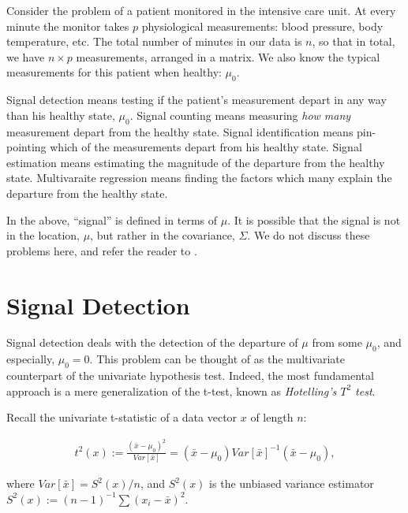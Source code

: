 \documentclass[]{book}
\theoremstyle{definition}
\theoremstyle{definition}
\theoremstyle{remark}
\let\BeginKnitrBlock\begin \let\EndKnitrBlock\end
\begin{document}
\BeginKnitrBlock{example}
\protect\hypertarget{ex:icu}{}{\label{ex:icu}}Consider the problem of a
patient monitored in the intensive care unit. At every minute the
monitor takes \(p\) physiological measurements: blood pressure, body
temperature, etc. The total number of minutes in our data is \(n\), so
that in total, we have \(n \times p\) measurements, arranged in a
matrix. We also know the typical measurements for this patient when
healthy: \(\mu_0\).

Signal detection means testing if the patient's measurement depart in
any way than his healthy state, \(\mu_0\). Signal counting means
measuring \emph{how many} measurement depart from the healthy state.
Signal identification means pin-pointing which of the measurements
depart from his healthy state. Signal estimation means estimating the
magnitude of the departure from the healthy state. Multivaraite
regression means finding the factors which many explain the departure
from the healthy state.
\EndKnitrBlock{example}

\BeginKnitrBlock{remark}
In the above, ``signal'' is defined in terms of
\(\mu\). It is possible that the signal is not in the location, \(\mu\),
but rather in the covariance, \(\Sigma\). We do not discuss these
problems here, and refer the reader to \citet{nadler2008finite}.
\EndKnitrBlock{remark}

\section{Signal Detection}\label{signal-detection}

Signal detection deals with the detection of the departure of \(\mu\)
from some \(\mu_0\), and especially, \(\mu_0=0\). This problem can be
thought of as the multivariate counterpart of the univariate hypothesis
test. Indeed, the most fundamental approach is a mere generalization of
the t-test, known as \emph{Hotelling's \(T^2\) test}.

Recall the univariate t-statistic of a data vector \(x\) of length
\(n\):

\begin{align}
  t^2(x):= \frac{(\bar{x}-\mu_0)^2}{Var[\bar{x}]}= (\bar{x}-\mu_0)Var[\bar{x}]^{-1}(\bar{x}-\mu_0),
  \label{eq:t-test}
\end{align}

where \(Var[\bar{x}]=S^2(x)/n\), and \(S^2(x)\) is the unbiased variance
estimator \(S^2(x):=(n-1)^{-1}\sum (x_i-\bar x)^2\).
\end{document}
